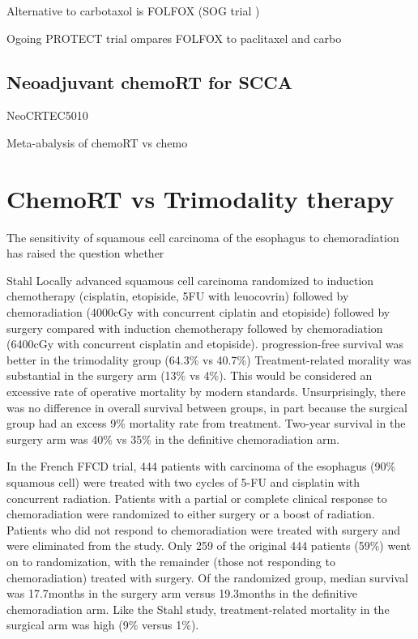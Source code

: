\documentclass[
]{book}
\begin{document}
Alternative to carbotaxol is FOLFOX (SOG trial \citep{leichman4555})

Ogoing PROTECT trial ompares FOLFOX to paclitaxel and carbo \citep{messager318}

\hypertarget{neoadjuvant-chemort-for-scca}{%
\subsection{Neoadjuvant chemoRT for SCCA}\label{neoadjuvant-chemort-for-scca}}

NeoCRTEC5010 \citep{yang2796}

Meta-abalysis of chemoRT vs chemo \citep{zhaoe0202185}

\hypertarget{chemort-vs-trimodality-therapy}{%
\section{ChemoRT vs Trimodality therapy}\label{chemort-vs-trimodality-therapy}}

The sensitivity of squamous cell carcinoma of the esophagus to chemoradiation has raised the question whether

Stahl Locally advanced squamous cell carcinoma randomized to induction chemotherapy (cisplatin, etopiside, 5FU with leuocovrin) followed by chemoradiation (4000cGy with concurrent ciplatin and etopiside) followed by surgery compared with induction chemotherapy followed by chemoradiation (6400cGy with concurrent cisplatin and etopiside).\citep{stahl2310} progression-free survival was better in the trimodality group (64.3\% vs 40.7\%) Treatment-related morality was substantial in the surgery arm (13\% vs 4\%). This would be considered an excessive rate of operative mortality by modern standards. Unsurprisingly, there was no difference in overall survival between groups, in part because the surgical group had an excess 9\% mortality rate from treatment. Two-year survival in the surgery arm was 40\% vs 35\% in the definitive chemoradiation arm. \citep{stahl4530}

In the French FFCD trial, 444 patients with carcinoma of the esophagus (90\% squamous cell) were treated with two cycles of 5-FU and cisplatin with concurrent radiation.\citep{bedenne1160} Patients with a partial or complete clinical response to chemoradiation were randomized to either surgery or a boost of radiation. Patients who did not respond to chemoradiation were treated with surgery and were eliminated from the study. Only 259 of the original 444 patients (59\%) went on to randomization, with the remainder (those not responding to chemoradiation) treated with surgery. Of the randomized group, median survival was 17.7months in the surgery arm versus 19.3months in the definitive chemoradiation arm. Like the Stahl study, treatment-related mortality in the surgical arm was high (9\% versus 1\%).
\end{document}
